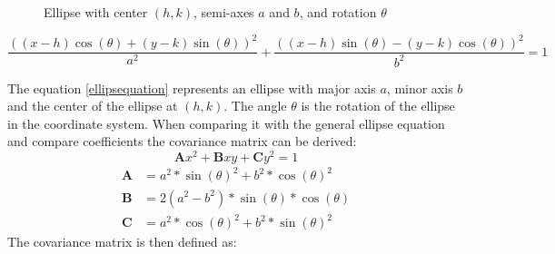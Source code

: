 \begin{figure}[h]
    \centering
    \caption{Ellipse with center $(h,k)$, semi-axes $a$ and $b$, and rotation $\theta$}
    \label{fig:sampleellipse}
\end{figure}

\begin{equation}
    \frac{((x-h)\cos(\theta) + (y-k)\sin(\theta))^2}{a^2} + \frac{((x-h)\sin(\theta) - (y-k)\cos(\theta))^2}{b^2} = 1
    \label{ellipsequation}
\end{equation}

The equation \ref{ellipsequation} represents an ellipse with major axis $a$, minor axis $b$ and the center of the ellipse at $(h,k)$. The angle $\theta$ is the rotation of the ellipse in the coordinate system. When comparing it with the general ellipse equation and compare coefficients the covariance matrix can be derived:
\begin{equation}
    \mathbf{A}x^2 + \mathbf{B}xy + \mathbf{C}y^2 = 1
    \label{ellipseco}
\end{equation} 
\begin{align}
    \mathbf{A}&=a^2 * \sin (\theta)^2 + b^2*\cos (\theta)^2 \\
    \mathbf{B}&= 2(a^2-b^2)*\sin (\theta)*\cos (\theta) \\
    \mathbf{C}&= a^2*\cos (\theta)^2 + b^2*\sin (\theta)^2
    \label{coefficients}
\end{align}
The covariance matrix is then defined as:

